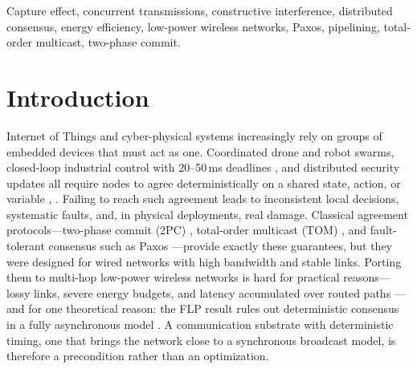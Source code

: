 \documentclass[journal]{IEEEtran}
\begin{document}
\begin{IEEEkeywords}
Capture effect, concurrent transmissions, constructive interference,
distributed consensus, energy efficiency, low-power wireless networks,
Paxos, pipelining, total-order multicast, two-phase commit.
\end{IEEEkeywords}

\IEEEpeerreviewmaketitle

\section{Introduction}

 Internet of Things and cyber-physical systems
increasingly rely on groups of embedded devices that must act as one.
Coordinated drone and robot swarms, closed-loop industrial control with
20--50\,ms deadlines \cite{mager19feedback}, and distributed security
updates all require nodes to agree deterministically on a shared state,
action, or variable \cite{alnahas17a2}, \cite{wu25dag}. Failing to reach
such agreement
leads to inconsistent local decisions, systematic faults, and, in physical
deployments, real damage. Classical agreement protocols---two-phase commit
(2PC) \cite{gray78notes}, total-order multicast (TOM)
\cite{defago04total}, and fault-tolerant consensus such as Paxos
\cite{lamport98parttime}---provide exactly these guarantees, but they were
designed for wired networks with high bandwidth and stable links. Porting
them to multi-hop low-power wireless networks is hard for practical
reasons---lossy links, severe energy budgets, and latency accumulated over
routed paths \cite{alnahas17a2}---and for one theoretical reason: the FLP
result rules out deterministic consensus in a fully asynchronous model
\cite{flp85}. A communication substrate with deterministic timing, one that
brings the network close to a synchronous broadcast model, is therefore a
precondition rather than an optimization.
\end{document}
